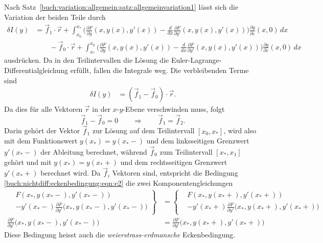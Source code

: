 Nach Satz~\ref{buch:variation:allgemein:satz:allgemeinvariation1} 
lässt sich die Variation der beiden Teile durch 
\begin{align*}
\delta I(y)
&=
\vec{f}_1\cdot \vec{r}
+
\int_{x_0}^{x_*}
\biggl(
\frac{\partial F}{\partial y}(x,y(x),y'(x))
-
\frac{d}{dx}
\frac{\partial F}{\partial y'}(x,y(x),y'(x))
\biggr)
\frac{\partial y}{\partial\varepsilon}(x,0)\,dx
\\
&\qquad
-
\vec{f}_0\cdot \vec{r}
+
\int_{x_*}^{x_0}
\biggl(
\frac{\partial F}{\partial y}(x,y(x),y'(x))
-
\frac{d}{dx}
\frac{\partial F}{\partial y'}(x,y(x),y'(x))
\biggr)
\frac{\partial y}{\partial\varepsilon}(x,0)\,dx
\end{align*}
ausdrücken.
Da in den Teilintervallen die Lösung die Euler-Lagrange-Differentialgleichung
erfüllt, fallen die Integrale weg.
Die verbleibenden Terme sind
\begin{align*}
\delta I(y)
&=
(\vec{f}_1-\vec{f}_0)\cdot \vec{r}.
\end{align*}
Da dies für alle Vektoren $\vec{r}$ in der $x$-$y$-Ebene verschwinden muss,
folgt
\begin{equation}
\vec{f}_1-\vec{f}_0
=
0
\qquad\Rightarrow\qquad
\vec{f}_1=\vec{f}_2.
\label{buch:nichtdiff:eckenbedingung:eqn:e2}
\end{equation}
Darin gehört der Vektor $\vec{f}_1$ zur Lösung auf dem Teilintervall
$[x_0,x_*]$,
wird also mit dem Funktionswert $y(x_*)=y(x_*-)$ und dem linksseitigen Grenzwert
$y'(x_*-)$ der Ableitung berechnet, während $\vec{f}_0$ zum Teilintervall
$[x_*,x_1]$ gehört und mit $y(x_*)=y(x_*+)$ und dem rechtsseitigen
Grenzwert $y'(x_*+)$ berechnet wird.
Da $\vec{f}_i$ Vektoren sind, entspricht die Bedingung
\eqref{buch:nichtdiff:eckenbedingung:eqn:e2}
die zwei Komponentengleichungen
\begin{align*}
\left.
\begin{aligned}
&F(x_*,y(x_*-),y'(x_*-))
\\
&- 
y'(x_*-)
\frac{\partial F}{\partial y'}\bigl(x_*,y(x_*-), y'(x_*-)\bigr)
\end{aligned}\right\}
&=
\left\{
\begin{aligned}
&F(x_*,y(x_*+),y'(x_*+))
\\
&- 
y'(x_*+)
\frac{\partial F}{\partial y'}\bigl(x_*,y(x_*+), y'(x_*+)\bigr)
\end{aligned}
\right.
\\
\frac{\partial F}{\partial y'}\bigl(x_*,y(x_*-), y'(x_*-)\bigr)
&=
\frac{\partial F}{\partial y'}\bigl(x_*,y(x_*+), y'(x_*+)\bigr)
\end{align*}
Diese Bedingung heisst auch die {\em weierstrass-erdmansche} Eckenbedingung.
%
%

